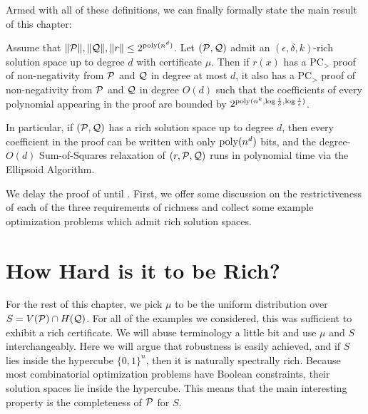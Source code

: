 Armed with all of these definitions, we can finally formally state the main result of this chapter:
\begin{theorem}\label{thm:bit_complexity-main}
Assume that $\|\mathcal P\|,\|\mathcal Q\|,\|r\| \leq 2^{\operatorname{poly}(n^d)}$. Let $(\mathcal P, \mathcal Q)$ admit an $(\epsilon,\delta,k)$-rich solution space up to degree $d$ with certificate $\mu$. Then if $r(x)$ has a PC$_>$ proof of non-negativity from $\mathcal P$ and $\mathcal Q$ in degree at most $d$, it also has a PC$_>$ proof of non-negativity from $\mathcal P$ and $\mathcal Q$ in degree $O(d)$ such that the coefficients of every polynomial appearing in the proof are bounded by $2^{\operatorname{poly}(n^k, \log \frac{1}{\delta}, \log \frac{1}{\epsilon})}$. 

In particular, if $(\mathcal P,\mathcal Q)$ has a rich solution space up to degree $d$, then every coefficient in the proof can be written with only $\operatorname{poly}(n^d)$ bits, and the degree-$O(d)$ Sum-of-Squares relaxation of $(r, \mathcal P, \mathcal Q)$ runs in polynomial time via the Ellipsoid Algorithm.
\end{theorem}

We delay the proof of  until . First, we offer some discussion on the restrictiveness of each of the three requirements of richness and collect some example optimization problems which admit rich solution spaces.

\section{How Hard is it to be Rich?}
For the rest of this chapter, we pick $\mu$ to be the uniform distribution over $S = V(\mathcal P) \cap H(\mathcal Q)$. For all of the examples we considered, this was sufficient to exhibit a rich certificate. We will abuse terminology a little bit and use $\mu$ and $S$ interchangeably. Here we will argue that robustness is easily achieved, and if $S$ lies inside the hypercube $\{0,1\}^n$, then it is naturally spectrally rich. Because most combinatorial optimization problems have Boolean constraints, their solution spaces lie inside the hypercube. This means that the main interesting property is the completeness of $\mathcal P$ for $S$.
